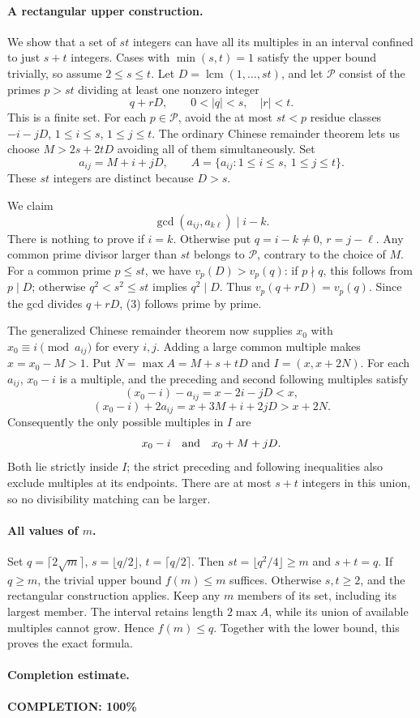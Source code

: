 \paragraph{A rectangular upper construction.}
We show that a set of \(st\) integers can have all its multiples
in an interval confined to just \(s+t\) integers.
Cases with \(\min(s,t)=1\) satisfy the upper bound trivially,
so assume \(2\leq s\leq t\).
Let \(D=\operatorname{lcm}(1,\ldots,st)\), and let \(\mathcal P\)
consist of the primes \(p>st\) dividing at least one nonzero integer
\[
 q+rD,\qquad 0<|q|<s,\quad |r|<t.
\]
This is a finite set. For each \(p\in\mathcal P\), avoid the at most
\(st<p\) residue classes \(-i-jD\), \(1\leq i\leq s\),
\(1\leq j\leq t\). The ordinary Chinese remainder theorem lets us
choose \(M>2s+2tD\) avoiding all of them simultaneously. Set
\[
 a_{ij}=M+i+jD,\qquad
 A=\{a_{ij}:1\leq i\leq s,\ 1\leq j\leq t\}.
\]
These \(st\) integers are distinct because \(D>s\).

We claim
\[
 \gcd(a_{ij},a_{k\ell})\mid i-k.                                \tag{3}
\]
There is nothing to prove if \(i=k\). Otherwise put
\(q=i-k\ne0\), \(r=j-\ell\).
Any common prime divisor larger than \(st\) belongs to
\(\mathcal P\), contrary to the choice of \(M\).
For a common prime \(p\leq st\), we have \(v_p(D)>v_p(q)\):
if \(p\nmid q\), this follows from \(p\mid D\); otherwise
\(q^2<s^2\leq st\) implies \(q^2\mid D\).
Thus \(v_p(q+rD)=v_p(q)\).
Since the gcd divides \(q+rD\), (3) follows prime by prime.

The generalized Chinese remainder theorem now supplies \(x_0\)
with \(x_0\equiv i\pmod{a_{ij}}\) for every \(i,j\).
Adding a large common multiple makes \(x=x_0-M>1\).
Put \(N=\max A=M+s+tD\) and \(I=(x,x+2N)\).
For each \(a_{ij}\), \(x_0-i\) is a multiple, and the preceding
and second following multiples satisfy
\[
 (x_0-i)-a_{ij}=x-2i-jD<x,
\]
\[
 (x_0-i)+2a_{ij}=x+3M+i+2jD>x+2N.
\]
Consequently the only possible multiples in \(I\) are
\[
 x_0-i\quad\hbox{and}\quad x_0+M+jD.
\]
Both lie strictly inside \(I\); the strict preceding and following
inequalities also exclude multiples at its endpoints.
There are at most \(s+t\) integers in this union, so no divisibility
matching can be larger.

\paragraph{All values of \(m\).}
Set \(q=\lceil2\sqrt m\rceil\),
\(s=\lfloor q/2\rfloor\), \(t=\lceil q/2\rceil\).
Then \(st=\lfloor q^2/4\rfloor\geq m\) and \(s+t=q\).
If \(q\geq m\), the trivial upper bound \(f(m)\leq m\) suffices.
Otherwise \(s,t\geq2\), and the rectangular construction applies.
Keep any \(m\) members of its set, including its largest member.
The interval retains length \(2\max A\), while its union of
available multiples cannot grow. Hence \(f(m)\leq q\).
Together with the lower bound, this proves the exact formula.

\paragraph{Completion estimate.}
\textbf{COMPLETION: 100\%}
